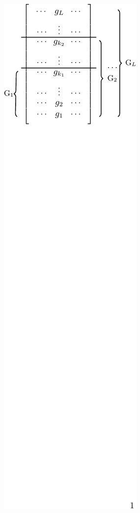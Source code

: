 \documentclass[10pt]{beamer}
\begin{document}
\begin{frame}
\begin{columns}[t]
		\begin{column}{0.39\textwidth}
						\begin{figure}
							{\includegraphics[width=0.95\columnwidth]{Nested_generator_matrix}} %
				  	\end{figure}
        \end{column}
    \end{columns}    
\end{frame}
\end{document}
